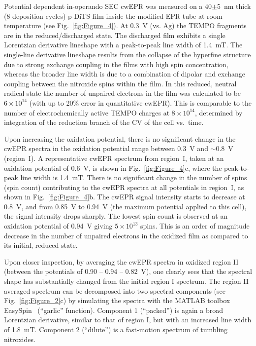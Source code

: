 Potential dependent in-operando SEC cwEPR was measured on a 40$\pm$5~nm thick (8 deposition cycles) p-DiTS film inside the modified EPR tube at room temperature (see Fig.~\ref{fig:Figure_4}). At 0.3~V (vs. Ag) the TEMPO fragments are in the reduced/discharged state. The discharged film exhibits a single Lorentzian derivative lineshape with a peak-to-peak line width of 1.4~mT. The single-line derivative lineshape results from the collapse of the hyperfine structure due to strong exchange coupling in the films with high spin concentration, whereas the broader line width is due to a combination of dipolar and exchange coupling between the nitroxide spins within the film. In this reduced, neutral radical state the number of unpaired electrons in the film was calculated to be $6\times10^{14}$ (with up to 20\% error in quantitative cwEPR). This is comparable to the number of electrochemically active TEMPO charges at $8\times10^{14}$, determined by integration of the reduction branch of the CV of the cell vs.\ time.
\par
Upon increasing the oxidation potential, there is no significant change in the cwEPR spectra in the oxidation potential range between 0.3~V and $\sim$0.8~V (region~I). A representative cwEPR spectrum from region~I, taken at an oxidation potential of 0.6~V, is shown in Fig.~\ref{fig:Figure_4}c, where the peak-to-peak line width is 1.4~mT. There is no significant change in the number of spins (spin count) contributing to the cwEPR spectra at all potentials in region~I, as shown in Fig.~\ref{fig:Figure_4}b. The cwEPR signal intensity starts to decrease at 0.8~V, and from 0.85~V to 0.94~V (the maximum potential applied to this cell), the signal intensity drops sharply. The lowest spin count is observed at an oxidation potential of 0.94~V giving $5\times10^{13}$ spins. This is an order of magnitude decrease in the number of unpaired electrons in the oxidized film as compared to its initial, reduced state.


\par
Upon closer inspection, by averaging the cwEPR spectra in oxidized region II (between the potentials of 0.90 -- 0.94 -- 0.82~V), one clearly sees that the spectral shape has substantially changed from the initial region I spectrum. The region II averaged spectrum can be decomposed into two spectral components (see Fig.~\ref{fig:Figure_2}c) by simulating the spectra with the MATLAB toolbox EasySpin~\cite{Stoll2006} (``garlic'' function). Component 1 (``packed'') is again a broad Lorentzian derivative, similar to that of region I, but with an increased line width of 1.8~mT. Component 2 (``dilute'') is a fast-motion spectrum of tumbling nitroxides.

